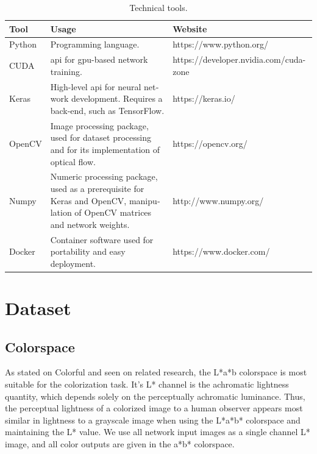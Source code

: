\documentclass[12pt,openright,oneside,a4paper,english]{abntex2}
\begin{document}
\begin{otherlanguage}{english}
    \begin{table}[H]
        \centering
        \begin{tabular}{l|l|l|l}
        Tool            & \multicolumn{2}{l|}{Usage}                 & Website             \\ \hline
        Python          & \multicolumn{2}{p{6cm}|}{Programming language.} & https://www.python.org/ \\ \hline
        CUDA            & \multicolumn{2}{p{6cm}|}{\acrshort{api} for \acrshort{gpu}-based network training.}  & https://developer.nvidia.com/cuda-zone \\ \hline
        Keras           & \multicolumn{2}{p{6cm}|}{High-level \acrshort{api} for neural network development. Requires a back-end, such as TensorFlow.}  & https://keras.io/   \\ \hline
        OpenCV          & \multicolumn{2}{p{6cm}|}{Image processing package, used for dataset processing and for its implementation of optical flow.}  & https://opencv.org/ \\ \hline
        Numpy           & \multicolumn{2}{p{6cm}|}{Numeric processing package, used as a prerequisite for Keras and OpenCV, manipulation of OpenCV matrices and network weights.}  & http://www.numpy.org/ \\ \hline
        Docker          &  \multicolumn{2}{p{6cm}|}{Container software used for portability and easy deployment.}  & https://www.docker.com/ \\ \hline
        \end{tabular}
        \label{table:tools}
        \caption{Technical tools.}
    \end{table}

    \section{Dataset}
    \subsection{Colorspace}
    As stated on Colorful \cite{colorful} and seen on related research, the L*a*b colorspace is most suitable for the colorization task. It's L* channel is the achromatic lightness quantity, which depends solely on the perceptually achromatic luminance. Thus, the perceptual lightness of a colorized image to a human observer appears most similar in lightness to a grayscale image when using the L*a*b* colorspace and maintaining the L* value. We use all network input images as a single channel L* image, and all color outputs are given in the a*b* colorspace.


\end{otherlanguage}
\end{document}
